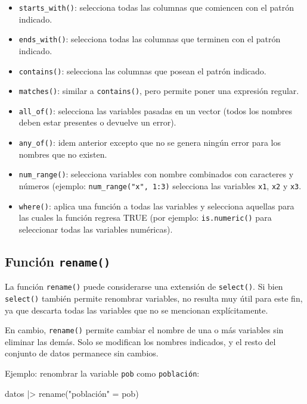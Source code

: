 \documentclass[
  spanish,
  letterpaper,
  DIV=11,
  numbers=noendperiod]{scrreprt}
\newenvironment{Shaded}{\begin{snugshade}}{\end{snugshade}}
\newcommand{\FunctionTok}[1]{\textcolor[rgb]{0.28,0.35,0.67}{#1}}
\newcommand{\NormalTok}[1]{\textcolor[rgb]{0.00,0.23,0.31}{#1}}
\newcommand{\OtherTok}[1]{\textcolor[rgb]{0.00,0.23,0.31}{#1}}
\newcommand{\SpecialCharTok}[1]{\textcolor[rgb]{0.37,0.37,0.37}{#1}}
\newcommand{\StringTok}[1]{\textcolor[rgb]{0.13,0.47,0.30}{#1}}
\begin{document}
\begin{itemize}
\item
  \texttt{starts\_with()}: selecciona todas las columnas que comiencen
  con el patrón indicado.
\item
  \texttt{ends\_with()}: selecciona todas las columnas que terminen con
  el patrón indicado.
\item
  \texttt{contains()}: selecciona las columnas que posean el patrón
  indicado.
\item
  \texttt{matches()}: similar a \texttt{contains()}, pero permite poner
  una expresión regular.
\item
  \texttt{all\_of()}: selecciona las variables pasadas en un vector
  (todos los nombres deben estar presentes o devuelve un error).
\item
  \texttt{any\_of()}: idem anterior excepto que no se genera ningún
  error para los nombres que no existen.
\item
  \texttt{num\_range()}: selecciona variables con nombre combinados con
  caracteres y números (ejemplo: \texttt{num\_range("x",\ 1:3)}
  selecciona las variables \texttt{x1}, \texttt{x2} y \texttt{x3}.
\item
  \texttt{where()}: aplica una función a todas las variables y
  selecciona aquellas para las cuales la función regresa TRUE (por
  ejemplo: \texttt{is.numeric()} para seleccionar todas las variables
  numéricas).
\end{itemize}

\subsection{\texorpdfstring{Función
\texttt{rename()}}{Función rename()}}\label{funciuxf3n-rename}

La función \texttt{rename()} puede considerarse una extensión de
\texttt{select()}. Si bien \texttt{select()} también permite renombrar
variables, no resulta muy útil para este fin, ya que descarta todas las
variables que no se mencionan explícitamente.

En cambio, \texttt{rename()} permite cambiar el nombre de una o más
variables sin eliminar las demás. Solo se modifican los nombres
indicados, y el resto del conjunto de datos permanece sin cambios.

Ejemplo: renombrar la variable \texttt{pob} como \texttt{población}:

\begin{Shaded}
\begin{Highlighting}[]
\NormalTok{datos }\SpecialCharTok{|\textgreater{}}
  \FunctionTok{rename}\NormalTok{(}\StringTok{"población"} \OtherTok{=}\NormalTok{ pob)}
\end{Highlighting}
\end{Shaded}
\end{document}
